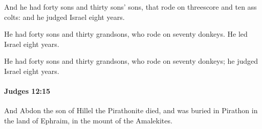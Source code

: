 			\begin{versebox}
					\item[BHS] 
					\item[ASV] And he had forty sons and thirty sons' sons, that rode on threescore and ten ass colts: and he judged Israel eight years.
					\item[NIV] He had forty sons and thirty grandsons, who rode on seventy donkeys. He led Israel eight years.
					\item[NRSV] He had forty sons and thirty grandsons, who rode on seventy donkeys; he judged Israel eight years.
			\end{versebox}

		\paragraph{Judges 12:15} %
			\label{JUDGES-12-15}

			And Abdon the son of Hillel the Pirathonite died, and was buried in Pirathon in the land of Ephraim, in the mount of the Amalekites.

